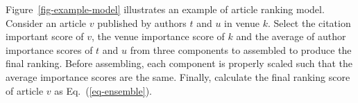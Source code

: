 \begin{example} \label{eg-layer-dag}
Figure~\ref{fig-example-model} illustrates an example of article ranking model. Consider an article $v$ published by authors $t$ and $u$ in venue $k$. Select the citation important score of $v$, the venue importance score of $k$ and the average of author importance scores of $t$ and $u$ from three components to assembled to produce the final ranking. Before assembling, each component is properly scaled such that the average importance scores are the same. Finally, calculate the final ranking score of article $v$ as Eq.~(\ref{eq-ensemble}).
\end{example}


